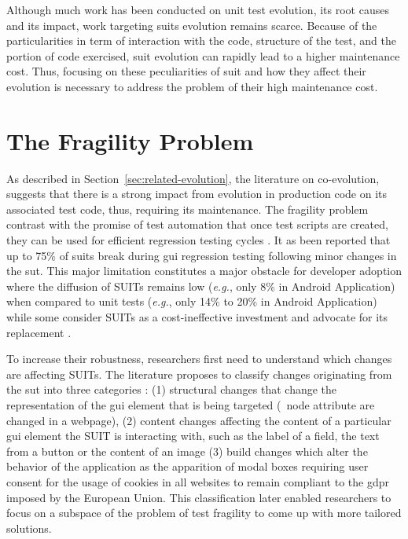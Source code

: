 Although much work has been conducted on unit test evolution, its root causes and its impact, work targeting \gls{suit}s evolution remains scarce. Because of the particularities in term of interaction with the code, structure of the test, and the portion of code exercised, \gls{suit} evolution can rapidly lead to a higher maintenance cost. Thus, focusing on these peculiarities of \gls{suit} and how they affect their evolution is necessary to address the problem of their high maintenance cost.

\section{The Fragility Problem}
\label{sec:related-fragility}

As described in Section~\ref{sec:related-evolution}, the literature on co-evolution, suggests that there is a strong impact from evolution in production code on its associated test code, thus, requiring its maintenance. The fragility problem contrast with the promise of test automation that once test scripts are created, they can be used for efficient regression testing cycles \cite{Yandrapally2014}.  It as been reported that up to 75\% of \gls{suit}s break during \gls{gui} regression testing \cite{Memon2003a, Grechanik2009, Coppola2016} following minor changes in the \gls{sut}. This major limitation constitutes a major obstacle for developer adoption where the diffusion of SUITs remains low (\emph{e.g.}, only 8\% \cite{Coppola2017, Coppola2019b} in Android Application) when compared to unit tests (\emph{e.g.}, only 14\% \cite{Kochhar2015} to 20\% \cite{Coppola2017, Coppola2019b} in Android Application) while some consider SUITs as a cost-ineffective investment and advocate for its replacement \cite{Vliegendhart2012, Chen2020}.

To increase their robustness, researchers first need to understand which changes are affecting SUITs. The literature proposes to classify changes originating from the \gls{sut} into three categories \cite{Choudhary2011, Yandrapally2014, Coppola2016}: (1) structural changes that change the representation of the \gls{gui} element that is being targeted (\eg\ node attribute are changed in a webpage), (2) content changes affecting the content of a particular \gls{gui} element the SUIT is interacting with, such as the label of a field, the text from a button or the content of an image (3) build changes which alter the behavior of the application as the apparition of modal boxes requiring user consent for the usage of cookies in all websites to remain compliant to the \gls{gdpr} imposed by the European Union. This classification later enabled researchers to focus on a subspace of the problem of test fragility to come up with more tailored solutions.

